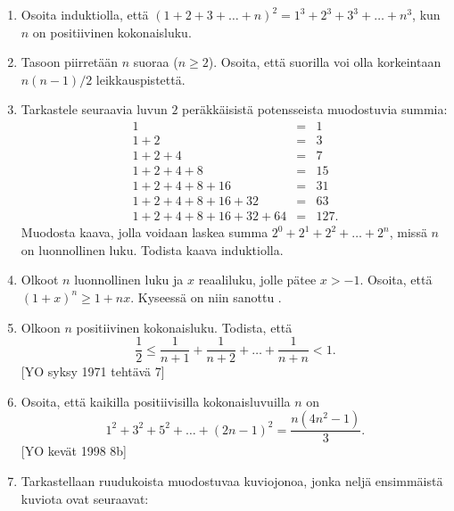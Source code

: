 \begin{enumerate}
\item Osoita induktiolla, että $(1 + 2 + 3 +\ldots + n)^2 = 1^3 + 2^3 + 3^3 + \ldots + n^3$, kun $n$ on positiivinen kokonaisluku.

\item Tasoon piirretään $n$ suoraa ($n\ge 2$). Osoita, että suorilla voi olla korkeintaan $n(n - 1)/2$ leikkauspistettä.

\item Tarkastele seuraavia luvun $2$ peräkkäisistä potensseista muodostuvia summia:
\[
\begin{array}{rcl}
1 &=& 1\\
1 + 2 &=& 3\\
1 + 2 + 4 &=& 7\\
1 + 2 + 4 + 8 &=& 15\\
1 + 2 + 4 + 8 + 16 &=& 31\\
1 + 2 + 4 + 8 + 16 + 32 &=& 63\\
1 + 2 + 4 + 8 + 16 + 32 + 64 &=& 127.
\end{array}
\]
Muodosta kaava, jolla voidaan laskea summa $2^0 + 2^1 + 2^2 + \ldots + 2^n$, missä $n$ on luonnollinen luku. Todista kaava induktiolla.

\item Olkoot $n$ luonnollinen luku ja $x$ reaaliluku, jolle pätee $x > -1$. Osoita, että $(1 + x)^n \ge 1 + nx$. Kyseessä on niin sanottu .

\item Olkoon $n$ positiivinen kokonaisluku. Todista, että
\[
\frac{1}{2}\le\frac{1}{n+1}+\frac{1}{n+2}+\ldots +\frac{1}{n+n} <1.
\]
[YO syksy 1971 tehtävä 7]

\newpage
\item
Osoita, että kaikilla positiivisilla kokonaisluvuilla $n$ on
\[
1^2+3^2+5^2+\ldots+(2n-1)^2 = \frac{n(4n^2-1)}{3}. 
\]
[YO kevät 1998 8b]

\item Tarkastellaan ruudukoista muodostuvaa kuviojonoa, jonka neljä ensimmäistä kuviota ovat seuraavat:


\end{enumerate}
